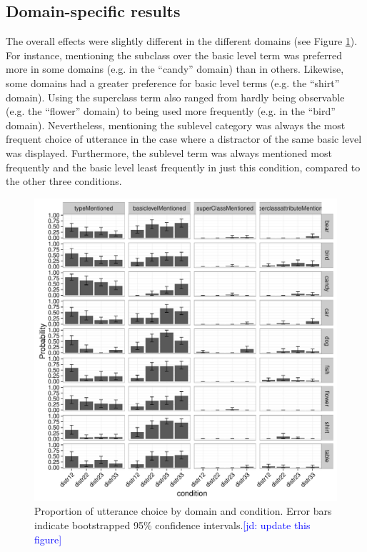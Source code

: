 \documentclass[10pt,letterpaper]{article}
\newcommand{\jd}[1]{\textcolor{Blue}{[jd: #1]}}
\newcommand{\figref}[1]{Figure \ref{#1}}
\begin{document}
\subsection{\bf Domain-specific results}
The overall effects were slightly different in the different domains (see \figref{fig:domains}). For instance, mentioning the subclass over the basic level term was preferred more in some domains (e.g. in the ``candy'' domain) than in others. Likewise, some domains had a greater preference for basic level terms (e.g. the ``shirt'' domain). Using the superclass term also ranged from hardly being observable (e.g. the ``flower'' domain) to being used more frequently (e.g. in the ``bird'' domain). Nevertheless, mentioning the sublevel category was always the most frequent choice of utterance in the case where a distractor of the same basic level was displayed. Furthermore, the sublevel term was always mentioned most frequently and the basic level least frequently in just this condition, compared to the other three conditions.

\begin{figure}[ht!]
\centering
\includegraphics[width=.5\textwidth]{graphs/proportion_mentioned_features_by_domain}
\caption{Proportion of utterance choice by domain and condition. Error bars indicate bootstrapped 95\% confidence intervals.\jd{update this figure}}
\label{fig:domains}
\end{figure}
\end{document}
